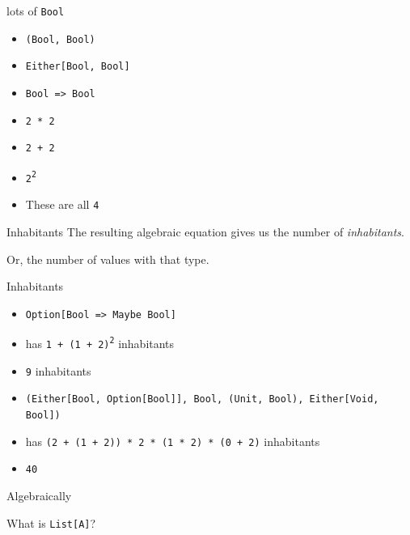 \begin{frame}
\begin{block}{lots of \lstinline{Bool}}
\begin{itemize}
  \item<1-> \lstinline{(Bool, Bool)}
  \item<1-> \lstinline{Either[Bool, Bool]}
  \item<1-> \lstinline{Bool => Bool}
  \item<2-> \lstinline{2 * 2}
  \item<2-> \lstinline{2 + 2}
  \item<2-> \lstinline{2}\textsuperscript{\lstinline{2}}
  \item<3-> These are all \lstinline{4}
\end{itemize}
\end{block}
\end{frame}

\begin{frame}
\begin{block}{Inhabitants}
The resulting algebraic equation gives us the number of \emph{inhabitants}.

Or, the number of values with that type.
\end{block}
\end{frame}

\begin{frame}
\begin{block}{Inhabitants}
\begin{itemize}
  \item<1-> \lstinline{Option[Bool => Maybe Bool]}
  \item<1-> has \lstinline{1 + (1 + 2)}\textsuperscript{\lstinline{2}} inhabitants
  \item<1-> \lstinline{9} inhabitants
  \item<2-> \tiny{\lstinline{(Either[Bool, Option[Bool]], Bool, (Unit, Bool), Either[Void, Bool])}}
  \item<2-> has \lstinline{(2 + (1 + 2)) * 2 * (1 * 2) * (0 + 2)} inhabitants
  \item<2-> \lstinline{40}
\end{itemize}
\end{block}
\end{frame}

\begin{frame}
\begin{block}{Algebraically}
\begin{center}
What is \lstinline{List[A]}?
\end{center}
\end{block}
\end{frame}

